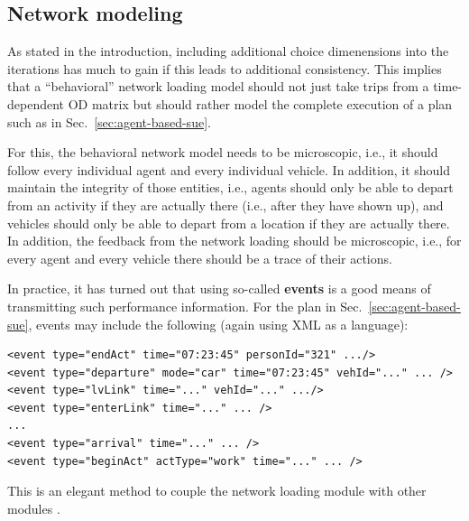 


\subsection{Network modeling}

As stated in the introduction, including additional choice
dimenensions into the iterations has much to gain if this leads to
additional consistency.
This implies that a ``behavioral'' network loading model
should not just take trips from a time-dependent OD matrix but should
rather model the complete execution of a plan such as in
Sec.~\ref{sec:agent-based-sue}.

For this, the behavioral network model needs to be microscopic,
i.e., it should follow every individual agent and every individual
vehicle.  In addition, it should maintain the integrity of those
entities, i.e., agents should only be able to depart from an activity
if they are actually there (i.e., after they have shown up), and
vehicles should only be able to depart from a location if they are
actually there.  In addition, the feedback from the network loading
should be microscopic, i.e., for every agent and every vehicle there
should be a trace of their actions.  

In practice, it has turned out that using so-called \textbf{events} is
a good means of transmitting such performance information.  For the
plan in Sec.~\ref{sec:agent-based-sue},
events may include the following (again
using XML as a language):
\begin{lstlisting}
<event type="endAct" time="07:23:45" personId="321" .../>
<event type="departure" mode="car" time="07:23:45" vehId="..." ... />
<event type="lvLink" time="..." vehId="..." .../>
<event type="enterLink" time="..." ... />
...
<event type="arrival" time="..." ... />
<event type="beginAct" actType="work" time="..." ... />
\end{lstlisting}
This is an elegant method to couple the network loading module
with other modules \citep[see,
  e.g.][]{FerberBook,Naumov2006phd,MastLundeEtc2009Tollsim}.

